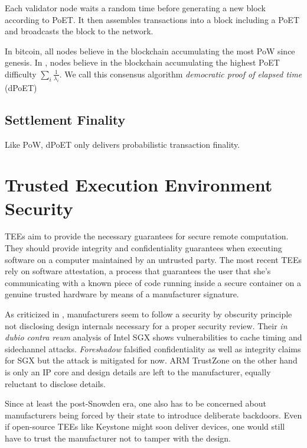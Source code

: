 \documentclass[conference]{IEEEtran}
\begin{document}
Each \encointer validator node waits a random time before generating a new block according to PoET. It then assembles transactions into a block including a PoET and broadcasts the block to the network. 

In bitcoin, all nodes believe in the blockchain accumulating the most PoW since genesis. In \encointer, nodes believe in the blockchain accumulating the highest PoET difficulty $\sum_i \frac{1}{\lambda_i}$. We call this consensus algorithm \textit{democratic proof of elapsed time} (dPoET)
\subsection{Settlement Finality}
Like PoW, dPoET only delivers probabilistic transaction finality.

\section{Trusted Execution Environment Security}
TEEs aim to provide the necessary guarantees for secure remote computation. They should provide integrity and confidentiality guarantees when executing software on a computer maintained by an untrusted party. The most recent TEEs rely on software attestation, a process that guarantees the user that she's communicating with a known piece of code running inside a secure container on a genuine trusted hardware by means of a manufacturer signature.

As criticized in \cite{costan16}, manufacturers seem to follow a security by obscurity principle not disclosing design internals necessary for a proper security review. Their \textit{in dubio contra reum} analysis of Intel SGX shows vulnerabilities to cache timing and sidechannel attacks. \textit{Foreshadow} \cite{foreshadow} falsified confidentiality as well as integrity claims for SGX but the attack is mitigated for now. ARM TrustZone on the other hand is only an IP core and design details are left to the manufacturer, equally reluctant to disclose details. 

Since at least the post-Snowden era, one also has to be concerned about manufacturers being forced by their state to introduce deliberate backdoors. Even if open-source TEEs like Keystone \cite{keystone} might soon deliver devices, one would still have to trust the manufacturer not to tamper with the design. 
\end{document}
